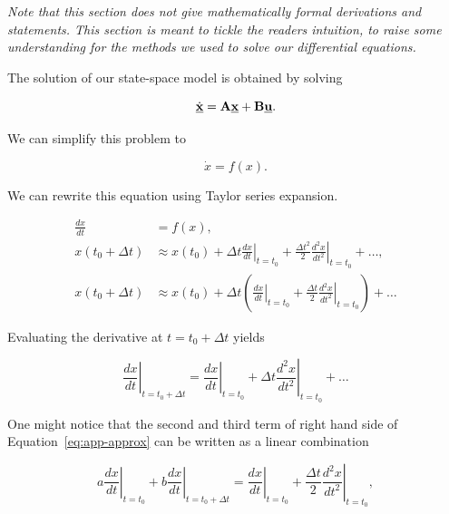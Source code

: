 \documentclass[11pt,titlepage]{report}
\begin{document}
\begin{appendices}
\textit{Note that this section does not give mathematically formal derivations and statements. This section is meant to tickle the readers intuition, to raise some understanding for the methods we used to solve our differential equations.}

The solution of our state-space model is obtained by solving

\begin{equation}
\dot{\mathbf{\underline{x}}}=\mathbf{A}\mathbf{\underline{x}}+\mathbf{B}\mathbf{\underline{u}}.
\end{equation}

We can simplify this problem to

\begin{equation}
\dot{x}=f(x).
\end{equation}

We can rewrite this equation using Taylor series expansion.

\begin{align}
\frac{dx}{dt} &= f(x), \\
x(t_0+\Delta t) &\approx
x(t_0)+
\left. \Delta t \frac{dx}{dt} \right|_{t=t_0}+
\frac{\Delta t^2}{2}\left. \frac{d^2x}{dt^2} \right|_{t=t_0}+
\dots, \\
x(t_0+\Delta t) &\approx
x(t_0)+
\Delta t \left(
\left. \frac{dx}{dt} \right|_{t=t_0}+
\frac{\Delta t}{2}\left. \frac{d^2x}{dt^2} \right|_{t=t_0}
\right) + \dots \label{eq:app-approx}
\end{align}

Evaluating the derivative at $t=t_0+\Delta t$ yields

\begin{equation}
\left. \frac{dx}{dt} \right|_{t=t_0+\Delta t} =
\left. \frac{dx}{dt} \right|_{t=t_0} +
\Delta t \left. \frac{d^2x}{dt^2} \right|_{t=t_0} + \dots
\end{equation}

One might notice that the second and third term of right hand side of Equation~\ref{eq:app-approx} can be written as a linear combination

\begin{equation}
a \left. \frac{dx}{dt} \right|_{t=t_0} +
b \left. \frac{dx}{dt} \right|_{t=t_0+\Delta t} =
\left. \frac{dx}{dt} \right|_{t=t_0}+
\frac{\Delta t}{2}\left. \frac{d^2x}{dt^2} \right|_{t=t_0},
\end{equation}


\end{appendices}
\end{document}
